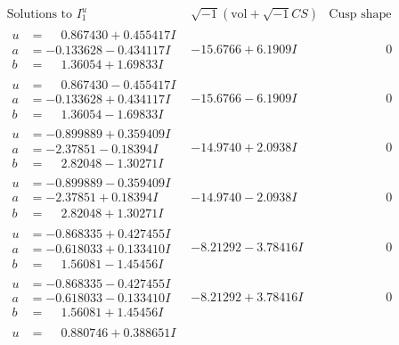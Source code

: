 \documentclass[1p]{elsarticle_modified}
\theoremstyle{definition}
\newcommand{\I}{\sqrt{-1}}
\begin{document}
$$\begin{array}{c|c|c}  
\text{Solutions to }I^u_{1}& \I (\text{vol} + \sqrt{-1}CS) & \text{Cusp shape}\\
 \hline 
\begin{aligned}
u &= \phantom{-}0.867430 + 0.455417 I \\
a &= -0.133628 - 0.434117 I \\
b &= \phantom{-}1.36054 + 1.69833 I\end{aligned}
 & -15.6766 + 6.1909 I & \phantom{-0.000000 } 0 \\ \hline\begin{aligned}
u &= \phantom{-}0.867430 - 0.455417 I \\
a &= -0.133628 + 0.434117 I \\
b &= \phantom{-}1.36054 - 1.69833 I\end{aligned}
 & -15.6766 - 6.1909 I & \phantom{-0.000000 } 0 \\ \hline\begin{aligned}
u &= -0.899889 + 0.359409 I \\
a &= -2.37851 - 0.18394 I \\
b &= \phantom{-}2.82048 - 1.30271 I\end{aligned}
 & -14.9740 + 2.0938 I & \phantom{-0.000000 } 0 \\ \hline\begin{aligned}
u &= -0.899889 - 0.359409 I \\
a &= -2.37851 + 0.18394 I \\
b &= \phantom{-}2.82048 + 1.30271 I\end{aligned}
 & -14.9740 - 2.0938 I & \phantom{-0.000000 } 0 \\ \hline\begin{aligned}
u &= -0.868335 + 0.427455 I \\
a &= -0.618033 + 0.133410 I \\
b &= \phantom{-}1.56081 - 1.45456 I\end{aligned}
 & -8.21292 - 3.78416 I & \phantom{-0.000000 } 0 \\ \hline\begin{aligned}
u &= -0.868335 - 0.427455 I \\
a &= -0.618033 - 0.133410 I \\
b &= \phantom{-}1.56081 + 1.45456 I\end{aligned}
 & -8.21292 + 3.78416 I & \phantom{-0.000000 } 0 \\ \hline\begin{aligned}
u &= \phantom{-}0.880746 + 0.388651 I \\

\end{aligned}
\end{array}$$
\end{document}
